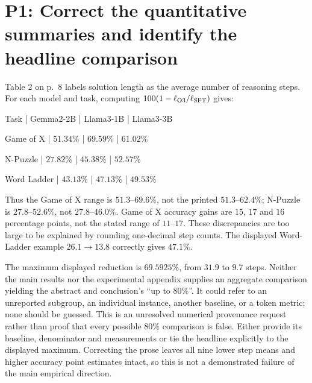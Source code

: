 \documentclass[10pt]{article}
\begin{document}
\section*{P1: Correct the quantitative summaries and identify the headline comparison}
Table 2 on p. 8 labels solution length as the average number of reasoning steps. For each model and task, computing \(100(1-\ell_{\rm O3}/\ell_{\rm SFT})\) gives:\par
Task | Gemma2-2B | Llama3-1B | Llama3-3B\par
Game of X | \(51.34\%\) | \(69.59\%\) | \(61.02\%\)\par
N-Puzzle | \(27.82\%\) | \(45.38\%\) | \(52.57\%\)\par
Word Ladder | \(43.13\%\) | \(47.13\%\) | \(49.53\%\)\par
Thus the Game of X range is \(51.3\)–\(69.6\%\), not the printed \(51.3\)–\(62.4\%\); N-Puzzle is \(27.8\)–\(52.6\%\), not \(27.8\)–\(46.0\%\). Game of X accuracy gains are \(15\), \(17\) and \(16\) percentage points, not the stated range of \(11\)–\(17\). These discrepancies are too large to be explained by rounding one-decimal step counts. The displayed Word-Ladder example \(26.1\to13.8\) correctly gives \(47.1\%\).\par
The maximum displayed reduction is \(69.5925\%\), from \(31.9\) to \(9.7\) steps. Neither the main results nor the experimental appendix supplies an aggregate comparison yielding the abstract and conclusion’s “up to \(80\%\)”. It could refer to an unreported subgroup, an individual instance, another baseline, or a token metric; none should be guessed. This is an unresolved numerical provenance request rather than proof that every possible \(80\%\) comparison is false. Either provide its baseline, denominator and measurements or tie the headline explicitly to the displayed maximum. Correcting the prose leaves all nine lower step means and higher accuracy point estimates intact, so this is not a demonstrated failure of the main empirical direction.\par
\end{document}

